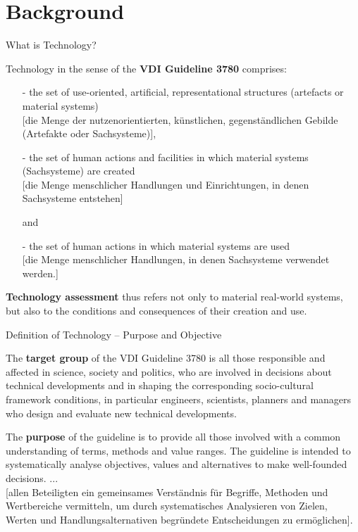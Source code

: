 \documentclass{beamer}
\title{Modelling Sustainable Systems\\ and Semantic Web\\[6pt] Technology
  \vskip1em}
\subtitle{Lecture in the Module 10-202-2309\\ for Master Computer Science}
\author{Prof. Dr. Hans-Gert Gräbe\\
\url{http://www.informatik.uni-leipzig.de/~graebe}}
\date{October 2021}
\begin{document}
{
\begin{frame}
  \titlepage
\end{frame}}

\section{Background}
\begin{frame}{What is Technology?}

  Technology in the sense of the \textbf{VDI Guideline 3780} comprises:
  \small\vspace{-1em}
\begin{itemize}
\item[-] the set of use-oriented, artificial, representational structures
  (artefacts or material systems)\\{} [die Menge der nutzenorientierten,
  künstlichen, gegenständlichen Gebilde (Artefakte oder Sachsysteme)],
\item[-] the set of human actions and facilities in which material systems
  (Sachsysteme) are created\\{} [die Menge menschlicher Handlungen und
  Einrichtungen, in denen Sachsysteme entstehen]

  and
\item[-] the set of human actions in which material systems are used\\{} [die
  Menge menschlicher Handlungen, in denen Sachsysteme verwendet werden.]
\end{itemize}\vspace{-1em}
\normalsize
  \textbf{Technology assessment} thus refers not only to material real-world
  systems, but also to the conditions and consequences of their creation and
  use.
\end{frame}

\begin{frame}{Definition of Technology -- Purpose and Objective}

The \textbf{target group} of the VDI Guideline 3780 is all those responsible
and affected in science, society and politics, who are involved in decisions
about technical developments and in shaping the corresponding socio-cultural
framework conditions, in particular engineers, scientists, planners and
managers who design and evaluate new technical developments.

The \textbf{purpose} of the guideline is to provide all those involved with a
common understanding of terms, methods and value ranges. The guideline is
intended to systematically analyse objectives, values and alternatives to make
well-founded decisions. ... \\{} [allen Beteiligten ein gemeinsames
  Verständnis für Begriffe, Methoden und Wertbereiche vermitteln, um durch
  systematisches Analysieren von Zielen, Werten und Handlungsalternativen
  begründete Entscheidungen zu ermöglichen].

\end{frame}
\end{document}
